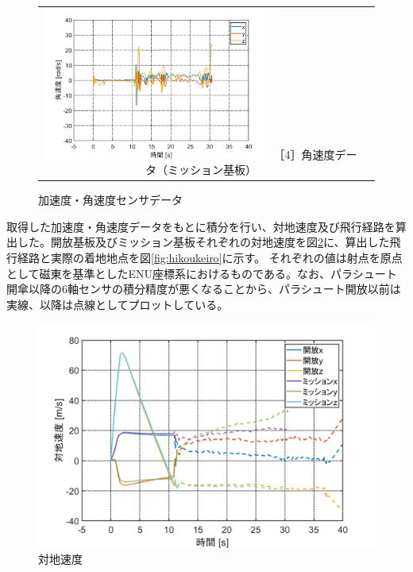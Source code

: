 \documentclass[a4paper,11pt,titlepage,uplatex]{jsarticle}
\begin{document}
\begin{figure}[H]
\begin{tabular}{cc}
\begin{minipage}{.48\textwidth}
        \end{minipage}
        \begin{minipage}{.48\textwidth}
            \centering
            \includegraphics[width=75mm]{pic_sim/gyr_ta.png}
            \hspace{16mm} {\small［4］角速度データ（ミッション基板）}
        \end{minipage}
    \end{tabular}
    \caption{加速度・角速度センサデータ}
    \label{fig:rokuziku}
\end{figure}

取得した加速度・角速度データをもとに積分を行い、対地速度及び飛行経路を算出した。開放基板及びミッション基板それぞれの対地速度を図\ref{fig:taitisokudo}に、算出した飛行経路と実際の着地地点を図\ref{fig:hikoukeiro}に示す。
それぞれの値は射点を原点として磁東を基準としたENU座標系におけるものである。なお、パラシュート開傘以降の6軸センサの積分精度が悪くなることから、パラシュート開放以前は実線、以降は点線としてプロットしている。

\begin{figure}[H]
    \centering
    \includegraphics[width=0.7\linewidth]{pic_sim/Ve2.png}
    \caption{対地速度}
    \label{fig:taitisokudo}
\end{figure}
\end{document}
